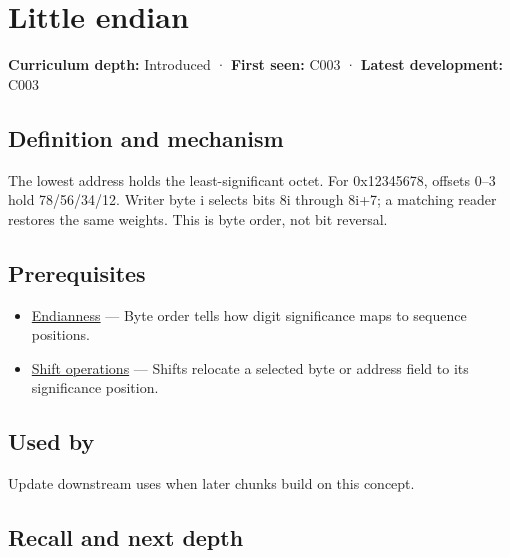 \hypertarget{appendix-367b6abf460e}{}\label{referencestart:appendix-367b6abf460e}
\section{Little endian}\label{appendix-367b6abf460e-little-endian}

\textbf{Curriculum depth:} Introduced · \textbf{First seen:} C003 · \textbf{Latest development:} C003

\begin{allmightroledefinition}

\subsection{Definition and mechanism}\label{appendix-367b6abf460e-definition-and-mechanism}

The lowest address holds the least-significant octet. For 0x12345678, offsets 0--3 hold 78/56/34/12. Writer byte i selects bits 8i through 8i+7; a matching reader restores the same weights. This is byte order, not bit reversal.

\end{allmightroledefinition}

\subsection{Prerequisites}\label{appendix-367b6abf460e-prerequisites}

\begin{itemize}
\tightlist
\item
  \hyperref[appendix-bc07c3d25b18]{Endianness} --- Byte order tells how digit significance maps to sequence positions.
\item
  \hyperref[appendix-73425b25118e]{Shift operations} --- Shifts relocate a selected byte or address field to its significance position.
\end{itemize}

\subsection{Used by}\label{appendix-367b6abf460e-used-by}

Update downstream uses when later chunks build on this concept.

\subsection{Recall and next depth}\label{appendix-367b6abf460e-recall-and-next-depth}

